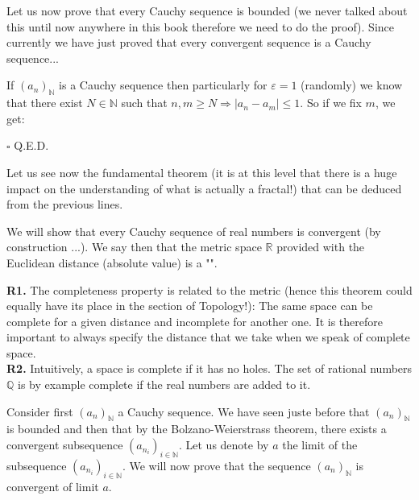 	\begin{theorem}
	Let us now prove that every Cauchy sequence is bounded (we never talked about this until now anywhere in this book therefore we need to do the proof). Since currently we have just proved that every convergent sequence is a Cauchy sequence...
	\end{theorem}
	\begin{dem}
	If $(a_n)_\mathbb{N}$ is a Cauchy sequence then particularly for $\varepsilon=1$ (randomly) we know that there exist $N\in \mathbb{N}$ such that $n,m\geq N\Rightarrow |a_n-a_m|\leq 1$. So if we fix $m$, we get:
	
	\begin{flushright}
		$\square$  Q.E.D.
	\end{flushright}
	\end{dem}
	Let us see now the fundamental theorem (it is at this level that there is a huge impact on the understanding of what is actually a fractal!) that can be deduced from the previous  lines.
	\begin{theorem}
	We will show that every Cauchy sequence of real numbers is convergent (by construction ...). We say then that the metric space $\mathbb{R}$ provided with the Euclidean distance (absolute value) is a "".
	\end{theorem}
	\begin{tcolorbox}[title=Remarks,colframe=black,arc=10pt]
	\textbf{R1.} The completeness property is related to the metric (hence this theorem could equally have its place in the section of Topology!): The same space can be complete for a given distance and incomplete for another one. It is therefore important to always specify the distance that we take when we speak of complete space.\\
	
	\textbf{R2.} Intuitively, a space is complete if it has no holes. The set of rational numbers $\mathbb{Q}$ is by example complete if the real numbers are added to it.
	\end{tcolorbox}
	\begin{theorem}
	Consider first $(a_n)_\mathbb{N}$ a Cauchy sequence. We have seen juste before that  $(a_n)_\mathbb{N}$ is bounded and then that by the Bolzano-Weierstrass theorem, there exists a convergent subsequence  $(a_{n_i})_{i\in\mathbb{N}}$. Let us denote by $a$ the limit of the subsequence $(a_{n_i})_{i\in\mathbb{N}}$. We will now prove that the sequence $(a_n)_\mathbb{N}$ is convergent of limit $a$.
	\end{theorem}
	
